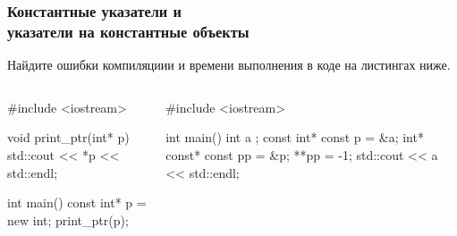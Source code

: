 \documentclass[compress, 8pt]{beamer}
\begin{document}
\begin{frame}[fragile]

    \frametitle{Константные указатели и \\ указатели на константные объекты}

    \begin{task}
        Найдите ошибки компиляциии и времени выполнения в коде на листингах ниже.
    \end{task}

    \begin{columns}[T]

        \begin{column}{0.5\textwidth}

            \begin{myinplacelisting}[minted language=cpp]
#include <iostream>

void print_ptr(int* p) {
    std::cout << *p
        << std::endl;
}

int main() {
    const int* p = new int{};
    print_ptr(p);
}
            \end{myinplacelisting}

        \end{column}

        \begin{column}{0.5\textwidth}

            \begin{myinplacelisting}[minted language=cpp]
#include <iostream>

int main() {
    int a {};
    const int* const p = &a;
    int* const* const pp = &p;
    **pp = -1;
    std::cout << a
        << std::endl;
}
            \end{myinplacelisting}

        \end{column}

    \end{columns}

\end{frame}
\end{document}
